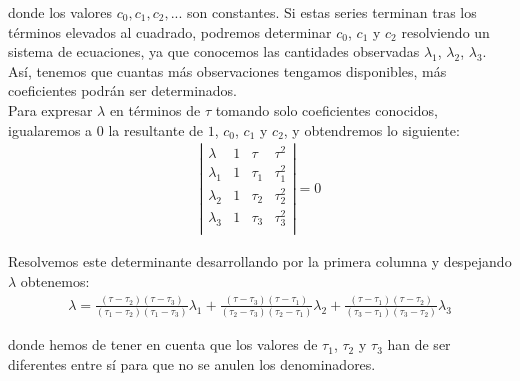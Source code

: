\documentclass[11pt]{article}
\begin{document}
\noindent donde los valores $c_0, c_1, c_2, ...$ son constantes. Si estas series terminan tras los términos elevados al cuadrado, podremos determinar $c_0$, $c_1$ y $c_2$ resolviendo un sistema de ecuaciones, ya que conocemos las cantidades observadas $\lambda_1$, $\lambda_2$, $\lambda_3$. Así, tenemos que cuantas más observaciones tengamos disponibles, más coeficientes podrán ser determinados.\\

Para expresar $\lambda$ en términos de $\tau$ tomando solo coeficientes conocidos, igualaremos a 0 la resultante de $1$, $c_0$, $c_1$ y $c_2$, y obtendremos lo siguiente:
\begin{align}
\left|
\begin{array}{cccc}
\lambda & 1 & \tau & \tau^2\\
\lambda_1 & 1 & \tau_1 & \tau^2_1\\
\lambda_2 & 1 & \tau_2 & \tau^2_2\\
\lambda_3 & 1 & \tau_3 & \tau^2_3\\
\end{array}
\right|
=0
\label{eq:resultante}
\end{align}

Resolvemos este determinante desarrollando por la primera columna y despejando $\lambda$ obtenemos:
\begin{align}
\lambda=
\frac{(\tau-\tau_2)(\tau-\tau_3)}{(\tau_1-\tau_2)(\tau_1-\tau_3)}\lambda_1
+\frac{(\tau-\tau_3)(\tau-\tau_1)}{(\tau_2-\tau_3)(\tau_2-\tau_1)}\lambda_2
+\frac{(\tau-\tau_1)(\tau-\tau_2)}{(\tau_3-\tau_1)(\tau_3-\tau_2)}\lambda_3
\label{eq:lambda_value}
\end{align}

\noindent donde hemos de tener en cuenta que los valores de $\tau_1$, $\tau_2$ y $\tau_3$ han de ser diferentes entre sí para que no se anulen los denominadores.\\
\end{document}
